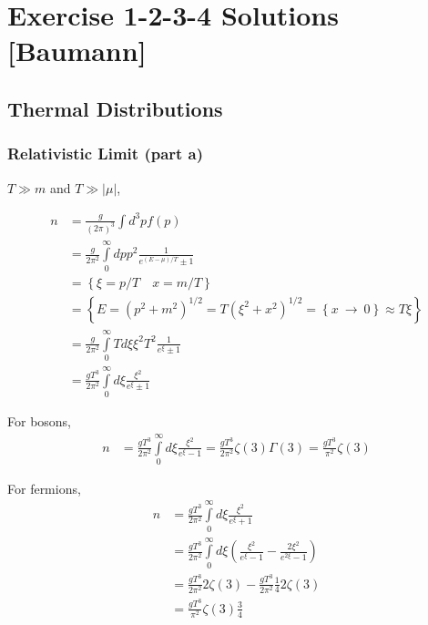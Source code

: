 \section{Exercise 1-2-3-4 Solutions [Baumann] \label{ex:1234sols}}

\subsection{Thermal Distributions}
\subsubsection{Relativistic Limit (part a)}

$T \gg m$ and $T \gg \mathopen|\mu\mathclose|$,

\begin{align}
    n &= \frac{g}{\left(2\pi\right)^{3}}\int d^{3}p f\left(p\right) \\
    &= \frac{g}{2\pi^{2}}\int\limits_{0}^{\infty} dp p^{2}\frac{1}{e^{\left(E-\mu\right)/T} \pm 1}\\
    &= \left\{\xi = p/T\quad x=m/T\right\}\\
    &= \left\{E = \left(p^{2} + m^{2}\right)^{1/2} = T\left(\xi^{2} + x^{2}\right)^{1/2} = \left\{x\ \rightarrow\ 0\right\} \approx T\xi\right\}\\
    &= \frac{g}{2\pi^{2}}\int\limits_{0}^{\infty} Td\xi \xi^{2}T^{2}\frac{1}{e^{\xi} \pm 1}\\
    &= \frac{gT^{3}}{2\pi^{2}}\int\limits_{0}^{\infty}d\xi \frac{\xi^{2}}{e^{\xi} \pm 1}
\end{align}

For bosons,
\begin{align}
    n &= \frac{gT^{3}}{2\pi^{2}}\int\limits_{0}^{\infty}d\xi \frac{\xi^{2}}{e^{\xi} - 1} = \frac{gT^{3}}{2\pi^{2}}\zeta\left(3\right)\Gamma\left(3\right) = \frac{gT^{3}}{\pi^{2}}\zeta\left(3\right)
\end{align}

For fermions,
\begin{align}
    n &= \frac{gT^{3}}{2\pi^{2}}\int\limits_{0}^{\infty}d\xi \frac{\xi^{2}}{e^{\xi} + 1}\\
    &= \frac{gT^{3}}{2\pi^{2}}\int\limits_{0}^{\infty}d\xi \left(\frac{\xi^{2}}{e^{\xi}-1} - \frac{2\xi^{2}}{e^{2\xi} - 1}\right)\\
    &= \frac{gT^{3}}{2\pi^{2}}2\zeta\left(3\right) - \frac{gT^{3}}{2\pi^{2}}\frac{1}{4}2\zeta\left(3\right)\\
    &= \frac{gT^{3}}{\pi^{2}}\zeta\left(3\right)\frac{3}{4}
\end{align}

